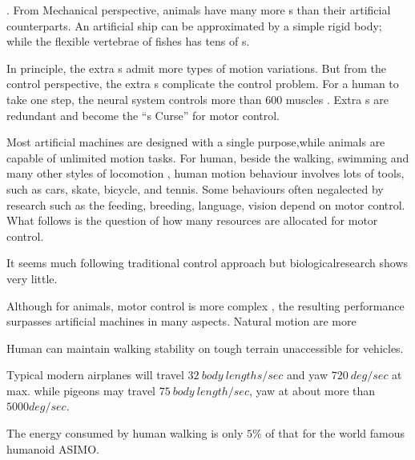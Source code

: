 \begin{itemize}
.
From Mechanical perspective, animals have many more {\dof}s than their artificial counterparts.
An artificial ship can be approximated by a simple rigid body; while the flexible vertebrae of fishes has tens of {\dof}s.


In principle, the extra {\dof}s admit more types of motion variations. 
But from the control perspective, the extra {\dof}s complicate the control problem. 
For a human to take one step,  the neural system controls more than 600 muscles .
Extra {\dof}s are redundant and become the ``{\dof}s Curse'' for motor control.
 
Most artificial machines are designed with a single purpose,while animals are capable  of unlimited motion tasks.
For human, beside the walking, swimming and many other styles of locomotion , human motion behaviour involves lots of tools, such as cars, skate, bicycle, and tennis.
Some behaviours often negalected by \cms research such as the feeding, breeding, language, vision depend on motor control. 
What follows is the question of how many resources are allocated for motor control.

It seems much following traditional control approach but biologicalresearch shows very little.

Although for animals,  motor control is more complex , the resulting performance surpasses artificial machines in many aspects.
Natural motion are more
\begin{enumerate} 

Human can maintain walking stability on tough terrain unaccessible for vehicles.

Typical modern airplanes will travel $32\: body\: lengths/sec$ and yaw $720\: deg/sec$ at max.
while pigeons may travel $75 \:body\: length / sec$, yaw at about more than $5000deg/sec$.

The energy consumed by human walking is only $5\%$ of that for the world famous humanoid ASIMO.
\end{enumerate}

\end{itemize}



